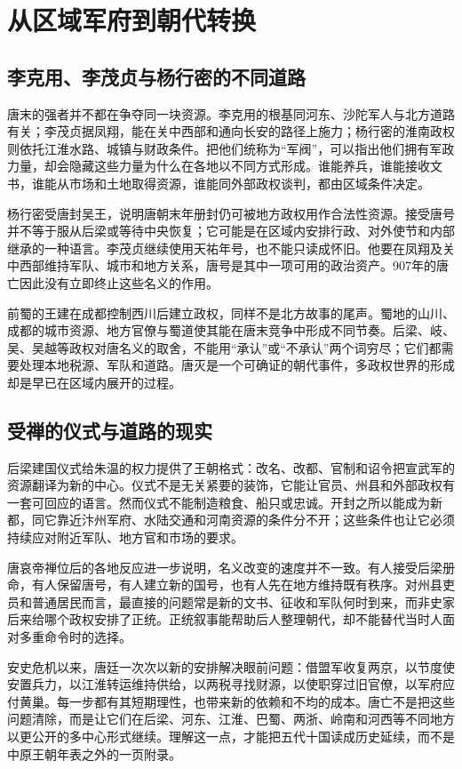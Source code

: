 \section{从区域军府到朝代转换}

\subsection{李克用、李茂贞与杨行密的不同道路}
唐末的强者并不都在争夺同一块资源。李克用的根基同河东、沙陀军人与北方道路有关；李茂贞据凤翔，能在关中西部和通向长安的路径上施力；杨行密的淮南政权则依托江淮水路、城镇与财政条件。把他们统称为“军阀”，可以指出他们拥有军政力量，却会隐藏这些力量为什么在各地以不同方式形成。谁能养兵，谁能接收文书，谁能从市场和土地取得资源，谁能同外部政权谈判，都由区域条件决定。

杨行密受唐封吴王，说明唐朝末年册封仍可被地方政权用作合法性资源。接受唐号并不等于服从后梁或等待中央恢复；它可能是在区域内安排行政、对外使节和内部继承的一种语言。李茂贞继续使用天祐年号，也不能只读成怀旧。他要在凤翔及关中西部维持军队、城市和地方关系，唐号是其中一项可用的政治资产。907年的唐亡因此没有立即终止这些名义的作用。

前蜀的王建在成都控制西川后建立政权，同样不是北方故事的尾声。蜀地的山川、成都的城市资源、地方官僚与蜀道使其能在唐末竞争中形成不同节奏。后梁、岐、吴、吴越等政权对唐名义的取舍，不能用“承认”或“不承认”两个词穷尽；它们都需要处理本地税源、军队和道路。唐灭是一个可确证的朝代事件，多政权世界的形成却是早已在区域内展开的过程。

\subsection{受禅的仪式与道路的现实}
后梁建国仪式给朱温的权力提供了王朝格式：改名、改都、官制和诏令把宣武军的资源翻译为新的中心。仪式不是无关紧要的装饰，它能让官员、州县和外部政权有一套可回应的语言。然而仪式不能制造粮食、船只或忠诚。开封之所以能成为新都，同它靠近汴州军府、水陆交通和河南资源的条件分不开；这些条件也让它必须持续应对附近军队、地方官和市场的要求。

唐哀帝禅位后的各地反应进一步说明，名义改变的速度并不一致。有人接受后梁册命，有人保留唐号，有人建立新的国号，也有人先在地方维持既有秩序。对州县吏员和普通居民而言，最直接的问题常是新的文书、征收和军队何时到来，而非史家后来给哪个政权安排了正统。正统叙事能帮助后人整理朝代，却不能替代当时人面对多重命令时的选择。

安史危机以来，唐廷一次次以新的安排解决眼前问题：借盟军收复两京，以节度使安置兵力，以江淮转运维持供给，以两税寻找财源，以使职穿过旧官僚，以军府应付黄巢。每一步都有其短期理性，也带来新的依赖和不均的成本。唐亡不是把这些问题清除，而是让它们在后梁、河东、江淮、巴蜀、两浙、岭南和河西等不同地方以更公开的多中心形式继续。理解这一点，才能把五代十国读成历史延续，而不是中原王朝年表之外的一页附录。

